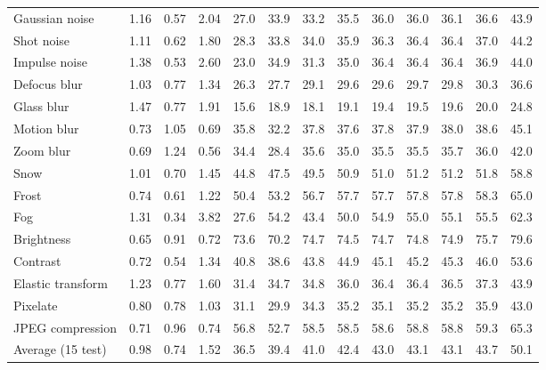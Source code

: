 \begin{table}[t]
\begin{tabular}{l|ccc|cc|cc|ccccc}
        \midrule
        Gaussian noise & 1.16 & 0.57 & 2.04 & 27.0 & 33.9 & 33.2 & 35.5 & 36.0 & 36.0 & 36.1 & 36.6 & 43.9 \\
        Shot noise & 1.11 & 0.62 & 1.80 & 28.3 & 33.8 & 34.0 & 35.9 & 36.3 & 36.4 & 36.4 & 37.0 & 44.2 \\
        Impulse noise & 1.38 & 0.53 & 2.60 & 23.0 & 34.9 & 31.3 & 35.0 & 36.4 & 36.4 & 36.4 & 36.9 & 44.0 \\
        Defocus blur & 1.03 & 0.77 & 1.34 & 26.3 & 27.7 & 29.1 & 29.6 & 29.6 & 29.7 & 29.8 & 30.3 & 36.6 \\
        Glass blur & 1.47 & 0.77 & 1.91 & 15.6 & 18.9 & 18.1 & 19.1 & 19.4 & 19.5 & 19.6 & 20.0 & 24.8 \\
        Motion blur & 0.73 & 1.05 & 0.69 & 35.8 & 32.2 & 37.8 & 37.6 & 37.8 & 37.9 & 38.0 & 38.6 & 45.1 \\
        Zoom blur & 0.69 & 1.24 & 0.56 & 34.4 & 28.4 & 35.6 & 35.0 & 35.5 & 35.5 & 35.7 & 36.0 & 42.0 \\
        Snow & 1.01 & 0.70 & 1.45 & 44.8 & 47.5 & 49.5 & 50.9 & 51.0 & 51.2 & 51.2 & 51.8 & 58.8 \\
        Frost & 0.74 & 0.61 & 1.22 & 50.4 & 53.2 & 56.7 & 57.7 & 57.7 & 57.8 & 57.8 & 58.3 & 65.0 \\
        Fog & 1.31 & 0.34 & 3.82 & 27.6 & 54.2 & 43.4 & 50.0 & 54.9 & 55.0 & 55.1 & 55.5 & 62.3 \\
        Brightness & 0.65 & 0.91 & 0.72 & 73.6 & 70.2 & 74.7 & 74.5 & 74.7 & 74.8 & 74.9 & 75.7 & 79.6 \\
        Contrast & 0.72 & 0.54 & 1.34 & 40.8 & 38.6 & 43.8 & 44.9 & 45.1 & 45.2 & 45.3 & 46.0 & 53.6 \\
        Elastic transform & 1.23 & 0.77 & 1.60 & 31.4 & 34.7 & 34.8 & 36.0 & 36.4 & 36.4 & 36.5 & 37.3 & 43.9 \\
        Pixelate & 0.80 & 0.78 & 1.03 & 31.1 & 29.9 & 34.3 & 35.2 & 35.1 & 35.2 & 35.2 & 35.9 & 43.0 \\
        JPEG compression & 0.71 & 0.96 & 0.74 & 56.8 & 52.7 & 58.5 & 58.5 & 58.6 & 58.8 & 58.8 & 59.3 & 65.3 \\
        \midrule
        Average (15 test) & 0.98 & 0.74 & 1.52 & 36.5 & 39.4 & 41.0 & 42.4 & 43.0 & 43.1 & 43.1 & 43.7 & 50.1 \\
        \bottomrule
    \end{tabular}
\end{table}
